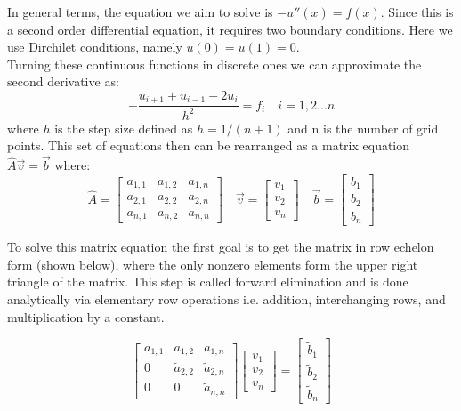 \documentclass[prc,amsmath,twocolumn,superscriptaddress]{revtex4}
\begin{document}
In general terms, the equation we aim to solve is $-u''(x)=f(x)$. Since this is a second order differential equation, it requires two boundary conditions. Here we use Dirchilet conditions, namely $u(0)=u(1)=0$. \\

Turning these continuous functions in discrete ones we can approximate the second derivative as:
\begin{equation}
-\frac{u_{i+1}+u_{i-1}-2u_i}{h^2}=f_i \quad i=1,2...n
\label{deriv}
\end{equation}
where $h$ is the step size defined as $h=1/(n+1)$ and n is the number of grid points. This set of equations then can be rearranged as a matrix equation $\hat{A}\vec{v}=\vec{b}$ where:
\begin{equation}
\hat{A}=\begin{bmatrix} a_{1,1} & a_{1,2} &a_{1,n} \\ a_{2,1}  & a_{2,2} &a_{2,n} \\ a_{n,1}  & a_{n,2}  &a_{n,n} \end{bmatrix}
\quad \vec{v}=\begin{bmatrix} v_1  \\ v_2\\ v_n \end{bmatrix} 
\quad \vec{b}=\begin{bmatrix} b_1  \\ b_2\\ b_n \end{bmatrix}
\end{equation}

To solve this matrix equation the first goal is to get the matrix in row echelon form (shown below), where the only nonzero elements form the upper right triangle of the matrix. This step is called forward elimination and is done analytically via elementary row operations i.e. addition, interchanging rows, and multiplication by a constant.

\begin{equation}
\begin{bmatrix} a_{1,1} & a_{1,2} &a_{1,n} \\ 0  & \tilde{a}_{2,2} &\tilde{a}_{2,n} \\ 0  & 0  &\tilde{a}_{n,n} \end{bmatrix}
\begin{bmatrix} v_1  \\ v_2\\ v_n \end{bmatrix}=\begin{bmatrix} \tilde{b}_1  \\ \tilde{b}_2\\ \tilde{b}_n \end{bmatrix}
\label{reduced}
\end{equation}
\end{document}
